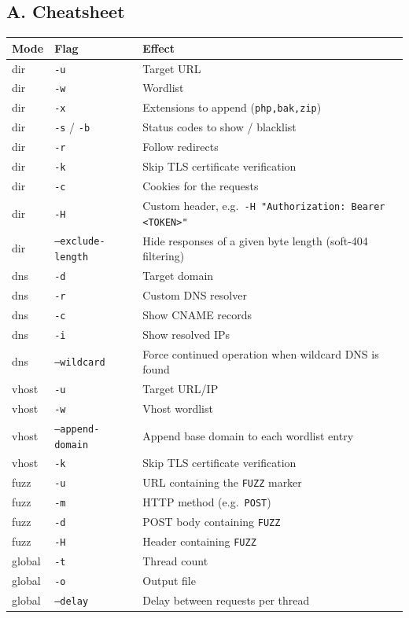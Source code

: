 \documentclass[11pt]{article}
\begin{document}
\subsection*{A. Cheatsheet}
\begin{center}
\small
\begin{tabular}{|l|l|p{7.5cm}|}
\hline
\textbf{Mode} & \textbf{Flag} & \textbf{Effect} \\
\hline
dir & \texttt{-u} & Target URL \\
dir & \texttt{-w} & Wordlist \\
dir & \texttt{-x} & Extensions to append (\texttt{php,bak,zip}) \\
dir & \texttt{-s} / \texttt{-b} & Status codes to show / blacklist \\
dir & \texttt{-r} & Follow redirects \\
dir & \texttt{-k} & Skip TLS certificate verification \\
dir & \texttt{-c} & Cookies for the requests \\
dir & \texttt{-H} & Custom header, e.g.\ \texttt{-H "Authorization: Bearer <TOKEN>"} \\
dir & \texttt{--exclude-length} & Hide responses of a given byte length (soft-404 filtering) \\
\hline
dns & \texttt{-d} & Target domain \\
dns & \texttt{-r} & Custom DNS resolver \\
dns & \texttt{-c} & Show CNAME records \\
dns & \texttt{-i} & Show resolved IPs \\
dns & \texttt{--wildcard} & Force continued operation when wildcard DNS is found \\
\hline
vhost & \texttt{-u} & Target URL/IP \\
vhost & \texttt{-w} & Vhost wordlist \\
vhost & \texttt{--append-domain} & Append base domain to each wordlist entry \\
vhost & \texttt{-k} & Skip TLS certificate verification \\
\hline
fuzz & \texttt{-u} & URL containing the \texttt{FUZZ} marker \\
fuzz & \texttt{-m} & HTTP method (e.g.\ \texttt{POST}) \\
fuzz & \texttt{-d} & POST body containing \texttt{FUZZ} \\
fuzz & \texttt{-H} & Header containing \texttt{FUZZ} \\
\hline
global & \texttt{-t} & Thread count \\
global & \texttt{-o} & Output file \\
global & \texttt{--delay} & Delay between requests per thread \\
\hline
\end{tabular}
\end{center}
\end{document}
